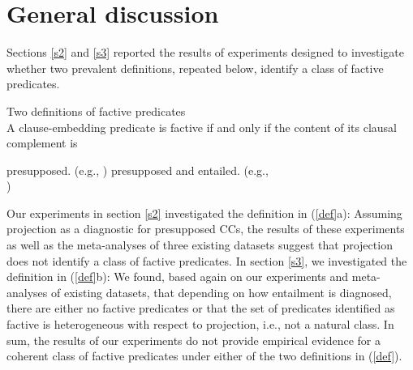 \documentclass[11pt,fleqn]{article}
\newcommand{\6}{\mbox{$[\hspace*{-.6mm}[$}}
\newcommand{\9}{\mbox{$]\hspace*{-.6mm}]$}}
\begin{document}
\section{General discussion}\label{s4}

Sections \ref{s2} and \ref{s3} reported the results of experiments designed to investigate whether two prevalent definitions, repeated below, identify a class of factive predicates. 

\begin{exe}
\exi{(\ref{def})} Two definitions of factive predicates \\ A clause-embedding predicate is factive if and only if the content of its clausal complement is 
\begin{xlist}
\ex presupposed. \hfill (e.g., \citealt{kiparsky-kiparsky70,karttunen71-implicative,karttunen71b})
\ex presupposed and entailed.  \hfill (e.g., \citealt{gazdar79a,schlenker10,abrusan2011}\\\hspace*{.2cm}\hfill \citealt{anand-hacquard2014,spector-egre2015})
\end{xlist}
\end{exe}
Our experiments in section \ref{s2} investigated the definition in (\ref{def}a): Assuming projection as a diagnostic for presupposed CCs, the results of these experiments as well as the meta-analyses of three existing datasets suggest that projection does not identify a class of factive predicates. In section \ref{s3}, we investigated the definition in (\ref{def}b): We found, based again on our experiments and meta-analyses of existing datasets, that depending on how entailment is diagnosed, there are either no factive predicates or that the set of predicates identified as factive is heterogeneous with respect to projection, i.e., not a natural class. In sum, the results of our experiments do not provide empirical evidence for a coherent class of factive predicates under either of the two definitions in (\ref{def}).
\end{document}
